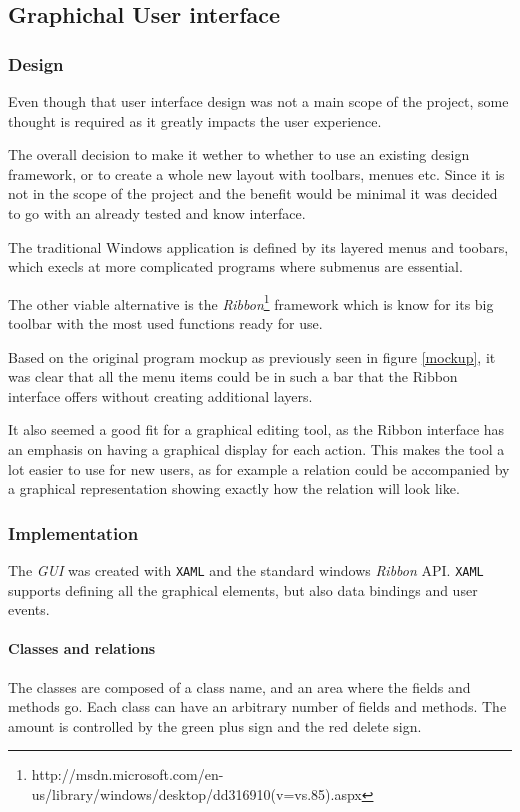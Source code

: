 \subsection{Graphichal User interface}

\subsubsection{Design}

Even though that
user interface design was not a main scope of the project, some thought is
required as it greatly impacts the user experience. 

The overall decision to make it wether to whether to use an existing design
framework, or to create a whole new layout with toolbars, menues etc. Since it
is not in the scope of the project and the benefit would be minimal it was
decided to go with an already tested and know interface. 

The traditional Windows application is defined by its layered menus and toobars,
which execls at more complicated programs where submenus are essential.

The other viable alternative is the
\textit{Ribbon}\footnote{http://msdn.microsoft.com/en-us/library/windows/desktop/dd316910(v=vs.85).aspx}
framework which is know for its big toolbar with the most used functions ready
for use.

Based on the original program mockup as previously seen in figure \ref{mockup},
it was clear that all the menu items could be in such a bar that the Ribbon
interface offers without creating additional layers.

It also seemed a good fit for a graphical editing tool, as the Ribbon interface
has an emphasis on having a graphical display for each action. This makes the
tool a lot easier to use for new users, as for example a relation could be
accompanied by a graphical representation showing exactly how the relation will
look like.

\subsubsection{Implementation} 
The \textit{GUI} was created with \texttt{XAML} and the standard windows
\textit{Ribbon} API. \texttt{XAML} supports defining all the graphical elements,
but also data bindings and user events.

\paragraph{Classes and relations}
The classes are composed of a class name, and an area where the
fields and methods go. Each class can have an arbitrary number of fields and
methods. The
amount is controlled by the green plus sign and the red delete sign.

